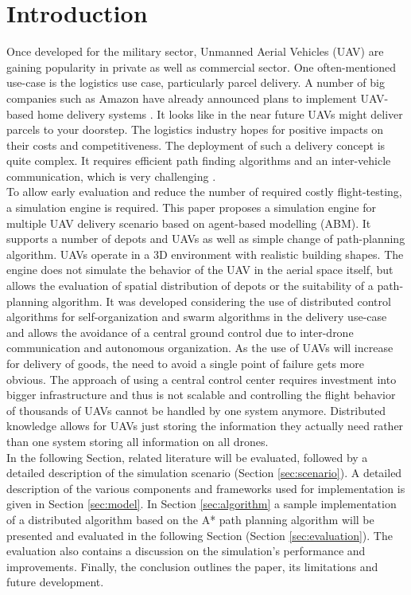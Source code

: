\section{Introduction}
Once developed for the military sector, Unmanned Aerial Vehicles (UAV) are gaining popularity in private as well as commercial sector. One often-mentioned use-case is the logistics use case, particularly parcel delivery. A number of big companies such as Amazon have already announced plans to implement UAV-based home delivery systems \cite{stolaroff.2014}. It looks like in the near future UAVs might deliver parcels to your doorstep. The logistics industry hopes for positive impacts on their costs and competitiveness. The deployment of such a delivery concept is quite complex. It requires efficient path finding algorithms and an inter-vehicle communication, which is very challenging \cite{bekmezci.2013}.\\
To allow early evaluation and reduce the number of required costly flight-testing, a simulation engine is required. This paper proposes a simulation engine for multiple UAV delivery scenario based on agent-based modelling (ABM). It supports a number of depots and UAVs as well as simple change of path-planning algorithm. UAVs operate in a 3D environment with realistic building shapes. The engine does not simulate the behavior of the UAV in the aerial space itself, but allows the evaluation of spatial distribution of depots or the suitability of a path-planning algorithm. It was developed considering the use of distributed control algorithms for self-organization and swarm algorithms in the delivery use-case and allows the avoidance of a central ground control due to inter-drone communication and autonomous organization. As the use of UAVs will increase for delivery of goods, the need to avoid a single point of failure gets more obvious. The approach of using a central control center requires investment into bigger infrastructure and thus is not scalable and controlling the flight behavior of thousands of UAVs cannot be handled by one system anymore. Distributed knowledge allows for UAVs just storing the information they actually need rather than one system storing all information on all drones. \\
In the following Section, related literature will be evaluated, followed by a detailed description of the simulation scenario (Section \ref{sec:scenario}). A detailed description of the various components and frameworks used for implementation is given in Section \ref{sec:model}. In Section \ref{sec:algorithm} a sample implementation of a distributed algorithm based on the A* path planning algorithm \cite{hart.1968} will be presented and evaluated in the following Section (Section \ref{sec:evaluation}). The evaluation also contains a discussion on the simulation's performance and improvements. Finally, the conclusion outlines the paper, its limitations and future development.


